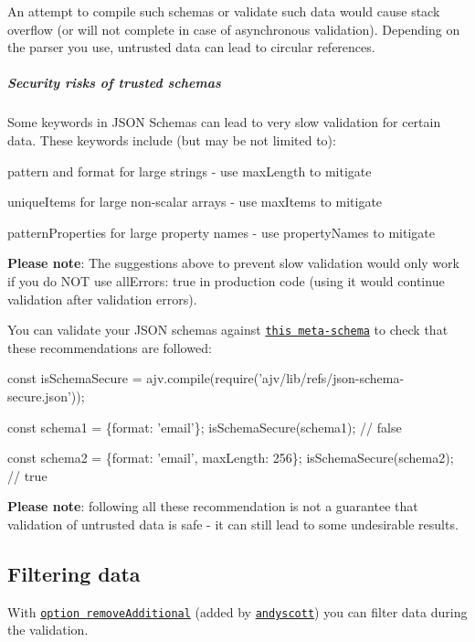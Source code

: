 An attempt to compile such schemas or validate such data would cause stack overflow (or will not complete in case of asynchronous validation). Depending on the parser you use, untrusted data can lead to circular references.

\subparagraph*{Security risks of trusted schemas}

Some keywords in J\+S\+ON Schemas can lead to very slow validation for certain data. These keywords include (but may be not limited to)\+:


\begin{DoxyItemize}
\item {\ttfamily pattern} and {\ttfamily format} for large strings -\/ use {\ttfamily max\+Length} to mitigate
\item {\ttfamily unique\+Items} for large non-\/scalar arrays -\/ use {\ttfamily max\+Items} to mitigate
\item {\ttfamily pattern\+Properties} for large property names -\/ use {\ttfamily property\+Names} to mitigate
\end{DoxyItemize}

{\bfseries Please note}\+: The suggestions above to prevent slow validation would only work if you do N\+OT use {\ttfamily all\+Errors\+: true} in production code (using it would continue validation after validation errors).

You can validate your J\+S\+ON schemas against \href{https://github.com/epoberezkin/ajv/blob/master/lib/refs/json-schema-secure.json}{\tt this meta-\/schema} to check that these recommendations are followed\+:


\begin{DoxyCode}
const isSchemaSecure = ajv.compile(require('ajv/lib/refs/json-schema-secure.json'));

const schema1 = \{format: 'email'\};
isSchemaSecure(schema1); // false

const schema2 = \{format: 'email', maxLength: 256\};
isSchemaSecure(schema2); // true
\end{DoxyCode}


{\bfseries Please note}\+: following all these recommendation is not a guarantee that validation of untrusted data is safe -\/ it can still lead to some undesirable results.

\subsection*{Filtering data}

With \href{#options}{\tt option {\ttfamily remove\+Additional}} (added by \href{https://github.com/andyscott}{\tt andyscott}) you can filter data during the validation.

